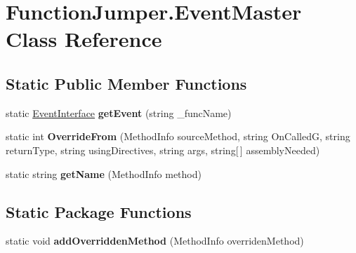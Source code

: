 \hypertarget{class_function_jumper_1_1_event_master}{}\section{Function\+Jumper.\+Event\+Master Class Reference}
\label{class_function_jumper_1_1_event_master}
\subsection*{Static Public Member Functions}
\begin{DoxyCompactItemize}
\item 
static \hyperlink{class_function_jumper_1_1_event_interface}{Event\+Interface} {\bfseries get\+Event} (string \+\_\+func\+Name)\hypertarget{class_function_jumper_1_1_event_master_ab60dc9db59f1a0ba137bd2bf2cb57e27}{}\label{class_function_jumper_1_1_event_master_ab60dc9db59f1a0ba137bd2bf2cb57e27}

\item 
static int {\bfseries Override\+From} (Method\+Info source\+Method, string On\+CalledG, string return\+Type, string using\+Directives, string args, string\mbox{[}$\,$\mbox{]} assembly\+Needed)\hypertarget{class_function_jumper_1_1_event_master_a3102765d8a6a7e3f1a02f8177b026cf5}{}\label{class_function_jumper_1_1_event_master_a3102765d8a6a7e3f1a02f8177b026cf5}

\item 
static string {\bfseries get\+Name} (Method\+Info method)\hypertarget{class_function_jumper_1_1_event_master_ad47c05684ae1994e8bcc7b54a3c6103a}{}\label{class_function_jumper_1_1_event_master_ad47c05684ae1994e8bcc7b54a3c6103a}

\end{DoxyCompactItemize}
\subsection*{Static Package Functions}
\begin{DoxyCompactItemize}
\item 
static void {\bfseries add\+Overridden\+Method} (Method\+Info overriden\+Method)\hypertarget{class_function_jumper_1_1_event_master_ad2f3f9c00e7bce0319e2b0a0a5279220}{}\label{class_function_jumper_1_1_event_master_ad2f3f9c00e7bce0319e2b0a0a5279220}

\end{DoxyCompactItemize}
